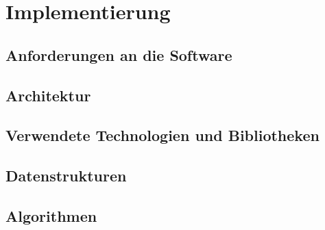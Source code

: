 %
\chapter{Implementierung}

\section{Anforderungen an die Software}

\section{Architektur}

\section{Verwendete Technologien und Bibliotheken}

\section{Datenstrukturen}

\section{Algorithmen}
